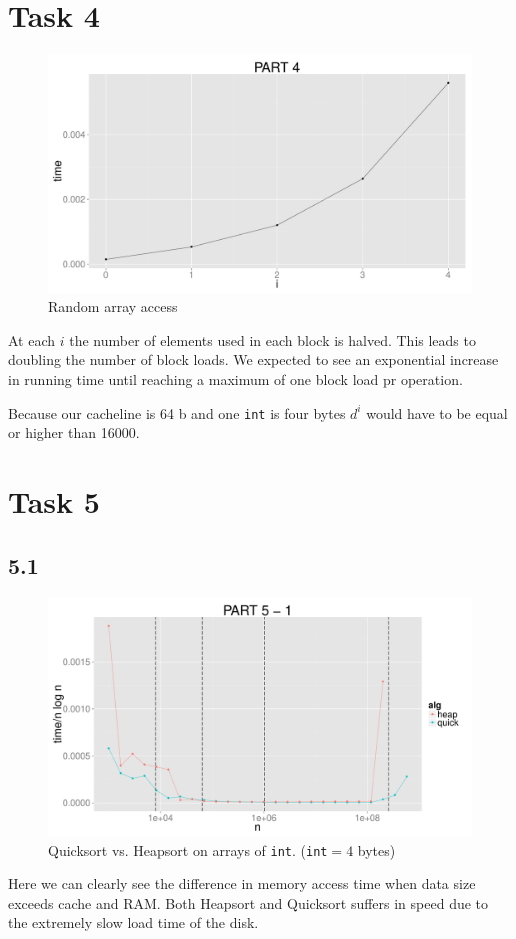 \documentclass{article}
\begin{document}
\section*{Task 4}
\begin{figure}[H]
    \centering
    \includegraphics[width=\textwidth]{images/part4.pdf}
    \caption{Random array access}
    \label{fig:awesome_image}
\end{figure}
At each $i$ the number of elements used in each block is halved. This leads to 
doubling the number of block loads. We expected to see an exponential increase 
in running time until reaching a maximum of one block load pr operation. 

Because our cacheline is 64 b and one \texttt{int} is four bytes $d^i$ would 
have to be equal or higher than 16000. 

\section*{Task 5}
\subsection*{5.1}
\begin{figure}[H]
    \centering
    \includegraphics[width=
    \textwidth]{images/part5_1.pdf}
    \caption{Quicksort vs. Heapsort on arrays of \texttt{int}. 
    (\texttt{int}$= 4$ bytes)}
\end{figure}
Here we can clearly see the difference in memory access time when data size 
exceeds cache and RAM. Both Heapsort and Quicksort suffers in speed due to the 
extremely slow load time of the disk. 
\end{document}
